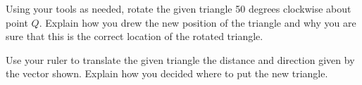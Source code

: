 \documentclass[nooutcomes,noauthor, handout]{ximera}
\begin{document}
\newpage

\begin{problem}
Using your tools as needed, rotate the given triangle 50 degrees clockwise about point $Q$.  Explain how you drew the new position of the triangle and why you are sure that this is the correct location of the rotated triangle.\\

\begin{image}
\end{image}
\vfill
\end{problem}


\newpage

\begin{problem}
Use your ruler to translate the given triangle the distance and direction given by the vector shown.  Explain how you decided where to put the new triangle.\\
\vskip 1.5in
\begin{image}
\end{image}
\vfill
\end{problem}


\end{document}
